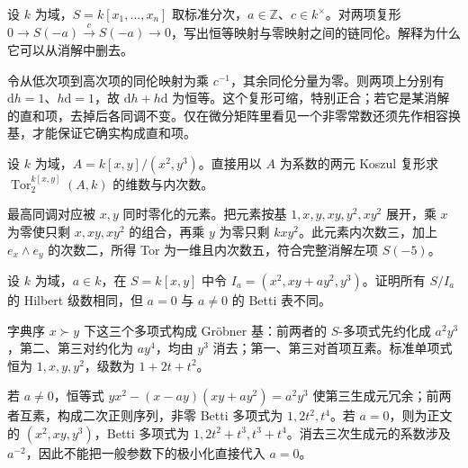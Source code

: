 \begin{exercise}\label{b3:ex:21-unit-homotopy}
	设 \(k\) 为域，\(S=k[x_1,\ldots,x_n]\) 取标准分次，\(a\in\mathbb Z\)、\(c\in k^\times\)。对两项复形 \(0\rightarrow S(-a)\xrightarrow{c}S(-a)\rightarrow0\)，写出恒等映射与零映射之间的链同伦。解释为什么它可以从消解中删去。
\end{exercise}
\begin{solution}
	令从低次项到高次项的同伦映射为乘 \(c^{-1}\)，其余同伦分量为零。则两项上分别有 \(\mathrm{d}h=1\)、\(h\mathrm{d}=1\)，故 \(\mathrm{d}h+h\mathrm{d}\) 为恒等。这个复形可缩，特别正合；若它是某消解的直和项，去掉后各同调不变。仅在微分矩阵里看见一个非零常数还须先作相容换基，才能保证它确实构成直和项。
\end{solution}

\begin{exercise}\label{b3:ex:21-tor-socle}
	设 \(k\) 为域，\(A=k[x,y]/(x^2,y^3)\)。直接用以 \(A\) 为系数的两元 Koszul 复形求 \(\operatorname{Tor}_2^{k[x,y]}(A,k)\) 的维数与内次数。
\end{exercise}
\begin{solution}
	最高同调对应被 \(x,y\) 同时零化的元素。把元素按基 \(1,x,y,xy,y^2,xy^2\) 展开，乘 \(x\) 为零使只剩 \(x,xy,xy^2\) 的组合，再乘 \(y\) 为零只剩 \(kxy^2\)。此元素内次数三，加上 \(e_x\wedge e_y\) 的次数二，所得 Tor 为一维且内次数五，符合完整消解左项 \(S(-5)\)。
\end{solution}

\begin{exercise}\label{b3:ex:21-betti-specialization}
	设 \(k\) 为域，\(a\in k\)，在 \(S=k[x,y]\) 中令 \(I_a=(x^2,xy+ay^2,y^3)\)。证明所有 \(S/I_a\) 的 Hilbert 级数相同，但 \(a=0\) 与 \(a\ne0\) 的 Betti 表不同。
\end{exercise}
\begin{solution}
	字典序 \(x\succ y\) 下这三个多项式构成 Gröbner 基：前两者的 \(S\)-多项式先约化成 \(a^2y^3\)，第二、第三对约化为 \(ay^4\)，均由 \(y^3\) 消去；第一、第三对首项互素。标准单项式恒为 \(1,x,y,y^2\)，级数为 \(1+2t+t^2\)。

	若 \(a\ne0\)，恒等式 \(yx^2-(x-ay)(xy+ay^2)=a^2y^3\) 使第三生成元冗余；前两者互素，构成二次正则序列，非零 Betti 多项式为 \(1,2t^2,t^4\)。若 \(a=0\)，则为正文的 \((x^2,xy,y^3)\)，Betti 多项式为 \(1,2t^2+t^3,t^3+t^4\)。消去三次生成元的系数涉及 \(a^{-2}\)，因此不能把一般参数下的极小化直接代入 \(a=0\)。
\end{solution}

